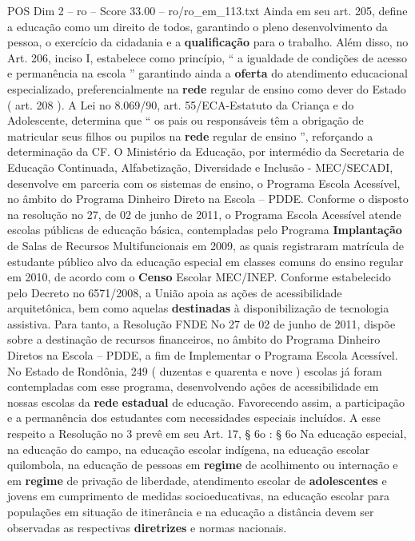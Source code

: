 \begin{textsample}{POS Dim 2 – ro – Score 33.00 – ro/ro\_em\_113.txt}
Ainda em seu art. 205, define a educação como um direito de todos, garantindo o pleno desenvolvimento da pessoa, o exercício da cidadania e a \textbf{qualificação} para o trabalho.
Além disso, no Art. 206, inciso I, estabelece como princípio, “ a igualdade de condições de acesso e permanência na escola ” garantindo ainda a \textbf{oferta} do atendimento educacional especializado, preferencialmente na \textbf{rede} regular de ensino como dever do Estado ( art. 208 ).
A Lei no 8.069/90, art. 55/ECA-Estatuto da Criança e do Adolescente, determina que “ os pais ou responsáveis têm a obrigação de matricular seus filhos ou pupilos na \textbf{rede} regular de ensino ”, reforçando a determinação da CF.
O Ministério da Educação, por intermédio da Secretaria de Educação Continuada, Alfabetização, Diversidade e Inclusão - MEC/SECADI, desenvolve em parceria com os sistemas de ensino, o Programa Escola Acessível, no âmbito do Programa Dinheiro Direto na Escola – PDDE.
Conforme o disposto na resolução no 27, de 02 de junho de 2011, o Programa Escola Acessível atende escolas públicas de educação básica, contempladas pelo Programa \textbf{Implantação} de Salas de Recursos Multifuncionais em 2009, as quais registraram matrícula de estudante público alvo da educação especial em classes comuns do ensino regular em 2010, de acordo com o \textbf{Censo} Escolar MEC/INEP.
Conforme estabelecido pelo Decreto no 6571/2008, a União apoia as ações de acessibilidade arquitetônica, bem como aquelas \textbf{destinadas} à disponibilização de tecnologia assistiva.
Para tanto, a Resolução FNDE No 27 de 02 de junho de 2011, dispõe sobre a destinação de recursos financeiros, no âmbito do Programa Dinheiro Diretos na Escola – PDDE, a fim de Implementar o Programa Escola Acessível.
No Estado de Rondônia, 249 ( duzentas e quarenta e nove ) escolas já foram contempladas com esse programa, desenvolvendo ações de acessibilidade em nossas escolas da \textbf{rede} \textbf{estadual} de educação.
Favorecendo assim, a participação e a permanência dos estudantes com necessidades especiais incluídos.
A esse respeito a Resolução no 3 prevê em seu Art. 17, § 6o : § 6o Na educação especial, na educação do campo, na educação escolar indígena, na educação escolar quilombola, na educação de pessoas em \textbf{regime} de acolhimento ou internação e em \textbf{regime} de privação de liberdade, atendimento escolar de \textbf{adolescentes} e jovens em cumprimento de medidas socioeducativas, na educação escolar para populações em situação de itinerância e na educação a distância devem ser observadas as respectivas \textbf{diretrizes} e normas nacionais.

\end{textsample}
